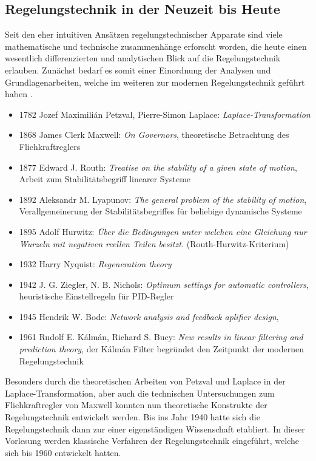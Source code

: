 \subsection{Regelungstechnik in der Neuzeit bis Heute}
%
Seit den eher intuitiven Ansätzen regelungstechnischer Apparate sind viele mathematische und technische zusammenhänge erforscht worden, die heute einen wesentlich differenzierten und analytischen Blick auf die Regelungstechnik erlauben. Zunächst bedarf es somit einer Einordnung der Analysen und Grundlagenarbeiten, welche im weiteren zur modernen Regelungstechnik geführt haben \cite{Zom13}.
%
\begin{itemize}
	\item 1782 Jozef Maximili\'an Petzval, Pierre-Simon Laplace: \textit{Laplace-Transformation}
	\item 1868 James Clerk Maxwell: \textit{On Governors}, theoretische Betrachtung des Fliehkraftreglers
	\item 1877 Edward J. Routh: \textit{Treatise on the stability of a given state of motion}, Arbeit zum Stabilitätsbegriff linearer Systeme
	\item 1892 Aleksandr M. Lyapunov: \textit{The general problem of the stability of motion}, Verallgemeinerung der Stabilitätsbegriffes für beliebige dynamische Systeme
	\item 1895 Adolf Hurwitz: \textit{Über die Bedingungen unter welchen eine Gleichung nur Wurzeln mit negativen reellen Teilen besitzt.} (Routh-Hurwitz-Kriterium)
	\item 1932 Harry Nyquist: \textit{Regeneration theory}
	\item 1942 J. G. Ziegler, N. B. Nichols: \textit{Optimum settings for automatic controllers}, heuristische Einstellregeln für PID-Regler
	\item 1945 Hendrik W. Bode: \textit{Network analysis and feedback aplifier design}, 
	\item 1961 Rudolf E. K\'alm\'an, Richard S. Bucy: \textit{New results in linear filtering and prediction theory}, der K\'alm\'an Filter begründet den Zeitpunkt der modernen Regelungstechnik
\end{itemize}
%
Besonders durch die theoretischen Arbeiten von Petzval und Laplace in der Laplace-Transformation, aber auch die technischen Untersuchungen zum Fliehkraftregler von Maxwell konnten nun theoretische Konstrukte der Regelungstechnik entwickelt werden. Bis ins Jahr 1940 hatte sich die Regelungstechnik dann zur einer eigenständigen Wissenschaft etabliert. In dieser Vorlesung werden klassische Verfahren der Regelungstechnik eingeführt, welche sich bis 1960 entwickelt hatten.\\\\
